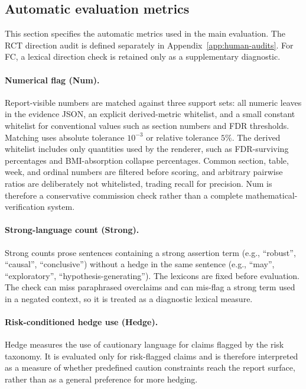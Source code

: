 \documentclass[10pt,twocolumn]{article}
\begin{document}
\subsection{Automatic evaluation metrics}
\label{app:audit-rules}

This section specifies the automatic metrics used in the main evaluation. The RCT direction audit is defined separately in Appendix~\ref{app:human-audits}. For FC, a lexical direction check is retained only as a supplementary diagnostic.

\paragraph{Numerical flag (Num).} Report-visible numbers are matched against three support sets: all numeric leaves in the evidence JSON, an explicit derived-metric whitelist, and a small constant whitelist for conventional values such as section numbers and FDR thresholds. Matching uses absolute tolerance $10^{-3}$ or relative tolerance $5\%$. The derived whitelist includes only quantities used by the renderer, such as FDR-surviving percentages and BMI-absorption collapse percentages. Common section, table, week, and ordinal numbers are filtered before scoring, and arbitrary pairwise ratios are deliberately not whitelisted, trading recall for precision. Num is therefore a conservative commission check rather than a complete mathematical-verification system.

\paragraph{Strong-language count (Strong).} Strong counts prose sentences containing a strong assertion term (e.g., ``robust'', ``causal'', ``conclusive'') without a hedge in the same sentence (e.g., ``may'', ``exploratory'', ``hypothesis-generating''). The lexicons are fixed before evaluation. The check can miss paraphrased overclaims and can mis-flag a strong term used in a negated context, so it is treated as a diagnostic lexical measure.

\paragraph{Risk-conditioned hedge use (Hedge).} Hedge measures the use of cautionary language for claims flagged by the risk taxonomy. It is evaluated only for risk-flagged claims and is therefore interpreted as a measure of whether predefined caution constraints reach the report surface, rather than as a general preference for more hedging.
\end{document}
